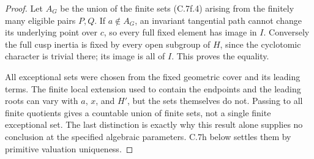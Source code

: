 \begin{proof}
Let $A_G$ be the union of the finite sets (C.7f.4) arising from
the finitely many eligible pairs $P,Q$. If $a\notin A_G$, an
invariant tangential path cannot change its underlying point over
$c$, so every full fixed element has image in $I$. Conversely the
full cusp inertia is fixed by every open subgroup of $H$, since
the cyclotomic character is trivial there; its image is all of
$I$. This proves the equality.

All exceptional sets were chosen from the fixed geometric cover
and its leading terms. The finite local extension used to contain
the endpoints and the leading roots can vary with $a$, $x$, and
$H'$, but the sets themselves do not. Passing to all finite
quotients gives a countable union of finite sets, not a single
finite exceptional set. The last distinction is exactly why this
result alone supplies no conclusion at the specified algebraic
parameters. C.7h below settles them by primitive valuation uniqueness.
\end{proof}
